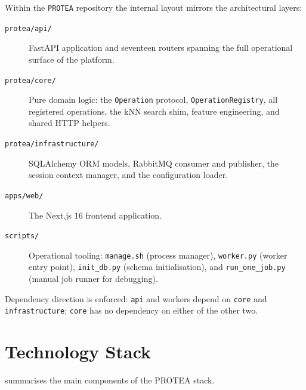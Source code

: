 Within the \texttt{PROTEA} repository the internal layout mirrors the
architectural layers:

\begin{description}
  \item[\texttt{protea/api/}] FastAPI application and seventeen routers
    spanning the full operational surface of the platform.
  \item[\texttt{protea/core/}] Pure domain logic: the \texttt{Operation}
    protocol, \texttt{OperationRegistry}, all registered operations, the
    kNN search shim, feature engineering, and shared HTTP helpers.
  \item[\texttt{protea/infrastructure/}] SQLAlchemy ORM models,
    RabbitMQ consumer and publisher, the session context manager, and the
    configuration loader.
  \item[\texttt{apps/web/}] The Next.js 16 frontend application.
  \item[\texttt{scripts/}] Operational tooling: \texttt{manage.sh} (process
    manager), \texttt{worker.py} (worker entry point), \texttt{init\_db.py}
    (schema initialisation), and \texttt{run\_one\_job.py} (manual job
    runner for debugging).
\end{description}

Dependency direction is enforced: \texttt{api} and workers depend on
\texttt{core} and \texttt{infrastructure}; \texttt{core} has no dependency
on either of the other two.

\section{Technology Stack}
\label{sec:stack}

 summarises the main components of the PROTEA stack.

